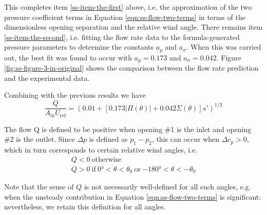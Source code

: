 This completes item \ref{ss-item-the-first} above, i.e. the approximation of the two pressure coefficient terms in Equation \ref{eqn:ss-flow-two-terms} in terms of the dimensionless opening separation and the relative wind angle. There remains item \ref{ss-item-the-second}, i.e. fitting the flow rate data to the formula-generated pressure parameters to determine the constants $a_p$ and $a_\sigma$. When this was carried out, the best fit was found to occur with $a_p = 0.173$ and $a_\sigma = 0.042$. Figure \ref{fig:ss-figure-3-in-original} shows the comparison between the flow rate prediction and the experimental data.

Combining with the previous results we have
\begin{equation}\label{eqn:ss-combined-eqn}
\frac{Q}{A_\text{in} U_\text{ref}}=\left(0.01+\left[0.173 |\Pi(\theta)|+0.042 \Sigma(\theta)\right]s'\right)^{1/2}
\end{equation}

The flow Q is defined to be positive when opening \#1 is the inlet and opening \#2 is the outlet. Since $\Delta p$ is defined as $p_1-p_2$, this can occur when $\Delta c_p > 0$, which in turn corresponds to certain relative wind angles, i.e.
\begin{equation}
\begin{gathered}
Q < 0\ \text{otherwise}\\ 			
Q > 0\ \text{if}\ \ang{0} < \theta < \theta_0\ \text{or}\  \ang{-180} < \theta < -\theta_0
\end{gathered}
\end{equation}

Note that the sense of $Q$ is not necessarily well-defined for all such angles, e.g.
when the unsteady contribution in Equation \ref{eqn:ss-flow-two-terms} is significant:
nevertheless, we retain this definition for all angles.

